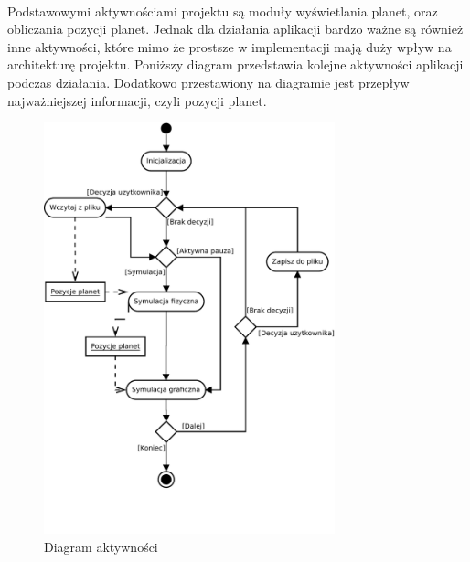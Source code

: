 \paragraph{}

Podstawowymi aktywnościami projektu są moduły wyświetlania planet, oraz obliczania pozycji planet. Jednak dla działania aplikacji bardzo ważne są również inne aktywności, które mimo że prostsze w implementacji mają duży wpływ na architekturę projektu. Poniższy diagram przedstawia kolejne aktywności aplikacji podczas działania. Dodatkowo przestawiony na diagramie jest przepływ najważniejszej informacji, czyli pozycji planet.

\begin{figure}[h]
	\centering
	\includegraphics[width=0.75\textwidth]{activity.pdf}
	\caption{Diagram aktywności}
	\label{fig:activity}
\end{figure}

\paragraph{}

